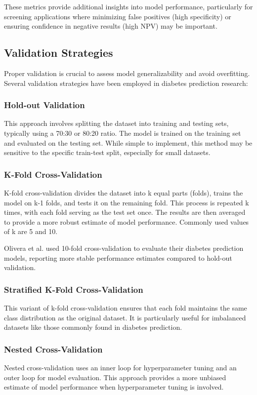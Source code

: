 \documentclass[journal]{IEEEtran}
\begin{document}
These metrics provide additional insights into model performance, particularly for screening applications where minimizing false positives (high specificity) or ensuring confidence in negative results (high NPV) may be important.

\subsection{Validation Strategies}
Proper validation is crucial to assess model generalizability and avoid overfitting. Several validation strategies have been employed in diabetes prediction research:

\subsubsection{Hold-out Validation}
This approach involves splitting the dataset into training and testing sets, typically using a 70:30 or 80:20 ratio. The model is trained on the training set and evaluated on the testing set. While simple to implement, this method may be sensitive to the specific train-test split, especially for small datasets.

\subsubsection{K-Fold Cross-Validation}
K-fold cross-validation divides the dataset into k equal parts (folds), trains the model on k-1 folds, and tests it on the remaining fold. This process is repeated k times, with each fold serving as the test set once. The results are then averaged to provide a more robust estimate of model performance. Commonly used values of k are 5 and 10.

Olivera et al. \cite{olivera2017} used 10-fold cross-validation to evaluate their diabetes prediction models, reporting more stable performance estimates compared to hold-out validation.

\subsubsection{Stratified K-Fold Cross-Validation}
This variant of k-fold cross-validation ensures that each fold maintains the same class distribution as the original dataset. It is particularly useful for imbalanced datasets like those commonly found in diabetes prediction.

\subsubsection{Nested Cross-Validation}
Nested cross-validation uses an inner loop for hyperparameter tuning and an outer loop for model evaluation. This approach provides a more unbiased estimate of model performance when hyperparameter tuning is involved.
\end{document}
